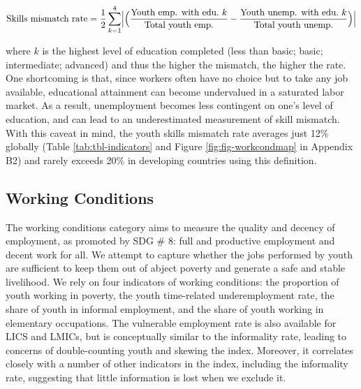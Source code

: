 \documentclass[
  a4paper, twoside, 12pt]{book}
\begin{document}
\footnotesize

\[\text{Skills mismatch rate}= \frac{1}{2} \sum_{k=1}^4 \Bigl| \Bigl(\frac{\text{Youth emp. with edu.} \ k}{\text{Total youth emp.}}- \frac{\text{Youth unemp. with edu.} \ k}{\text{Total youth unemp.}}\Bigl)\Bigl|\]
\normalsize
\vspace*{5pt}

where \(k\) is the highest level of education completed (less than basic; basic; intermediate; advanced) and thus the higher the mismatch, the higher the rate. One shortcoming is that, since workers often have no choice but to take any job available, educational attainment can become undervalued in a saturated labor market. As a result, unemployment becomes less contingent on one's level of education, and can lead to an underestimated measurement of skill mismatch. With this caveat in mind, the youth skills mismatch rate averages just 12\% globally (Table \ref{tab:tbl-indicators} and Figure \ref{fig:fig-workcondmap} in Appendix B2) and rarely exceeds 20\% in developing countries using this definition.

\hypertarget{working-conditions}{%
\subsection{Working Conditions}\label{working-conditions}}

The working conditions category aims to measure the quality and decency of employment, as promoted by SDG \# 8: full and productive employment and decent work for all. We attempt to capture whether the jobs performed by youth are sufficient to keep them out of abject poverty and generate a safe and stable livelihood. We rely on four indicators of working conditions: the proportion of youth working in poverty, the youth time-related underemployment rate, the share of youth in informal employment, and the share of youth working in elementary occupations. The vulnerable employment rate is also available for LICS and LMICs, but is conceptually similar to the informality rate, leading to concerns of double-counting youth and skewing the index. Moreover, it correlates closely with a number of other indicators in the index, including the informality rate, suggesting that little information is lost when we exclude it.
\end{document}
